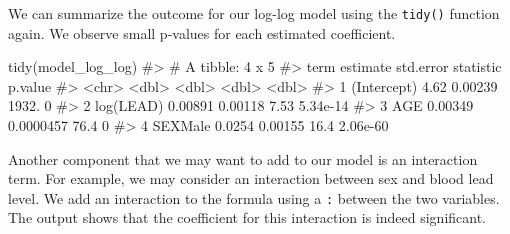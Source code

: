 \documentclass[
  letterpaper,
]{latex/krantz}
\makeatletter
\newenvironment{Shaded}{\begin{snugshade}}{\end{snugshade}}
\newcommand{\CommentTok}[1]{\textcolor[rgb]{0.37,0.37,0.37}{#1}}
\newcommand{\FunctionTok}[1]{\textcolor[rgb]{0.28,0.35,0.67}{#1}}
\newcommand{\NormalTok}[1]{\textcolor[rgb]{0.00,0.23,0.31}{#1}}
\newenvironment{kframe}{%
\medskip{}
\setlength{\fboxsep}{.8em}
 \def\at@end@of@kframe{}%
 \ifinner\ifhmode%
  \def\at@end@of@kframe{\end{minipage}}%
  \begin{minipage}{\columnwidth}%
 \fi\fi%
 \def\FrameCommand##1{\hskip\@totalleftmargin \hskip-\fboxsep
 \colorbox{shadecolor}{##1}\hskip-\fboxsep
     \hskip-\linewidth \hskip-\@totalleftmargin \hskip\columnwidth}%
 \MakeFramed {\advance\hsize-\width
   \@totalleftmargin\z@ \linewidth\hsize
   \@setminipage}}%
 {\par\unskip\endMakeFramed%
 \at@end@of@kframe}
\renewenvironment{Shaded}{\begin{kframe}}{\end{kframe}}
\makeatother
\begin{document}
We can summarize the outcome for our log-log model using the
\texttt{tidy()} function again. We observe small p-values for each
estimated coefficient.

\begin{Shaded}
\begin{Highlighting}[]
\FunctionTok{tidy}\NormalTok{(model\_log\_log)}
\CommentTok{\#\textgreater{} \# A tibble: 4 x 5}
\CommentTok{\#\textgreater{}   term        estimate std.error statistic  p.value}
\CommentTok{\#\textgreater{}   \textless{}chr\textgreater{}          \textless{}dbl\textgreater{}     \textless{}dbl\textgreater{}     \textless{}dbl\textgreater{}    \textless{}dbl\textgreater{}}
\CommentTok{\#\textgreater{} 1 (Intercept)  4.62    0.00239     1932.   0       }
\CommentTok{\#\textgreater{} 2 log(LEAD)    0.00891 0.00118        7.53 5.34e{-}14}
\CommentTok{\#\textgreater{} 3 AGE          0.00349 0.0000457     76.4  0       }
\CommentTok{\#\textgreater{} 4 SEXMale      0.0254  0.00155       16.4  2.06e{-}60}
\end{Highlighting}
\end{Shaded}

Another component that we may want to add to our model is an interaction
term. For example, we may consider an interaction between sex and blood
lead level. We add an interaction to the formula using a \texttt{:}
between the two variables. The output shows that the coefficient for
this interaction is indeed significant.
\end{document}
